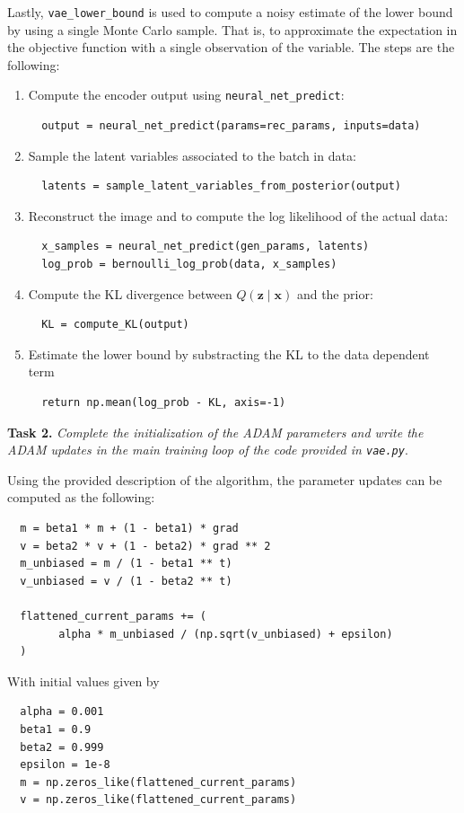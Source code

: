 \documentclass[11pt]{article}
\begin{document}
Lastly, \texttt{vae\_lower\_bound} is used to compute a noisy estimate of the lower bound by using a single Monte Carlo sample. That is, to approximate the expectation in the objective function with a single observation of the variable. The steps are the following:
\begin{enumerate}
  \item Compute the encoder output using \texttt{neural\_net\_predict}:
        \begin{verbatim}
  output = neural_net_predict(params=rec_params, inputs=data)
        \end{verbatim}
  \item Sample the latent variables associated to the batch in data:
        \begin{verbatim}
  latents = sample_latent_variables_from_posterior(output)
        \end{verbatim}
  \item Reconstruct the image and to compute the log likelihood of the actual data:
        \begin{verbatim}
  x_samples = neural_net_predict(gen_params, latents)
  log_prob = bernoulli_log_prob(data, x_samples)
        \end{verbatim}
  \item Compute the KL divergence between \( Q(\bm{z} \mid \bm{x}) \)  and the prior:
        \begin{verbatim}
  KL = compute_KL(output)
        \end{verbatim}
  \item Estimate the lower bound by substracting the KL to the data dependent term
        \begin{verbatim}
  return np.mean(log_prob - KL, axis=-1)
        \end{verbatim}
\end{enumerate}

\textbf{Task 2.} \emph{Complete the initialization of the ADAM parameters and write the ADAM updates
in the main training loop of the code provided in \texttt{vae.py}}.

Using the provided description of the algorithm, the parameter updates can be computed as the following:
\begin{verbatim}
  m = beta1 * m + (1 - beta1) * grad
  v = beta2 * v + (1 - beta2) * grad ** 2
  m_unbiased = m / (1 - beta1 ** t)
  v_unbiased = v / (1 - beta2 ** t)

  flattened_current_params += (
        alpha * m_unbiased / (np.sqrt(v_unbiased) + epsilon)
  )
\end{verbatim}
With initial values given by
\begin{verbatim}
  alpha = 0.001
  beta1 = 0.9
  beta2 = 0.999
  epsilon = 1e-8
  m = np.zeros_like(flattened_current_params)
  v = np.zeros_like(flattened_current_params)
\end{verbatim}
\end{document}

